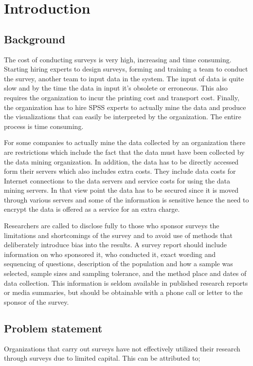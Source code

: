 \documentclass[a4paper,12pt]{article}
\begin{document}
\section{Introduction}

\subsection{Background}
The cost of conducting surveys is very high, increasing and time consuming. Starting hiring experts to design surveys, forming and training a team to conduct the survey, another team to input data in the system. The input of data is quite slow and by the time the data in input it’s obsolete or erroneous. This also requires the organization to incur the printing cost and transport cost. Finally, the organization has to hire SPSS experts to actually mine the data and produce the visualizations that can easily be interpreted by the organization. The entire process is time consuming.

\par
For some companies to actually mine the data collected by an organization there are restrictions which include the fact that the data must have been collected by the data mining organization. In addition, the data has to be directly accessed form their servers which also includes extra costs. 
They include data costs for Internet connections to the data servers and service costs for using the data mining servers.
In that view point the data has to be secured since it is moved through various servers and some of the information is sensitive hence the need to encrypt the data is offered as a service for an extra charge.  

\par
Researchers are called to disclose fully to those who sponsor surveys the limitations and shortcomings of the survey and to avoid use of methods that deliberately introduce bias into the results. A survey report should include information on who sponsored it, who conducted it, exact wording and sequencing of questions, description of the population and how a sample was selected, sample sizes and sampling tolerance, and the method place and dates of data collection. This information is seldom available in published research reports or media summaries, but should be obtainable with a phone call or letter to the sponsor of the survey. 

\subsection{Problem statement}
Organizations that carry out surveys have not effectively utilized their research through surveys due to limited capital. This can be attributed to;
\end{document}
